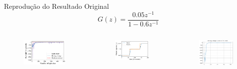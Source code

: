\documentclass[pdf]{beamer}
\begin{document}
\begin{frame}{Reprodução do Resultado Original}
	$$ G(z) = \frac{0.05z^{-1}}{1 - 0.6z^{-1}}$$
\begin{columns}
		\begin{subfigure}[t]{\textwidth}
			\centering
			\includegraphics[scale=0.5]{img/result_original_paper_aprendizado.png}
		\end{subfigure}
		\begin{subfigure}[t]{\textwidth}
			\centering
			\includegraphics[scale=0.5]{img/result_original_paper_steps.png}
		\end{subfigure}
		\begin{subfigure}[t]{\textwidth}
			\centering
			\includegraphics[scale=0.45]{img/result_original_aprendizado.png}

\end{subfigure}
\end{columns}
\end{frame}
\end{document}
